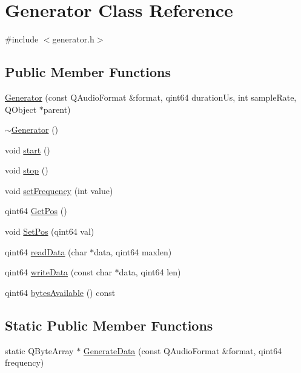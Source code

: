 \hypertarget{class_generator}{\section{Generator Class Reference}
\label{class_generator}
}


{\ttfamily \#include $<$generator.\-h$>$}

\subsection*{Public Member Functions}
\begin{DoxyCompactItemize}
\item 
\hyperlink{class_generator_ac70583c21208d97c0474d9ab23f69a2b}{Generator} (const Q\-Audio\-Format \&format, qint64 duration\-Us, int sample\-Rate, Q\-Object $\ast$parent)
\item 
\hyperlink{class_generator_acc85fbe22690003267ba899bacf777d1}{$\sim$\-Generator} ()
\item 
void \hyperlink{class_generator_a3f0bc6d7fed7eaf8d497d3e50149982b}{start} ()
\item 
void \hyperlink{class_generator_a698e9aa26989e005a709c297ebea3492}{stop} ()
\item 
void \hyperlink{class_generator_a54a730f69fe887837f3f83080e32201f}{set\-Frequency} (int value)
\item 
qint64 \hyperlink{class_generator_ada073b90efc5104c049eef04844c8801}{Get\-Pos} ()
\item 
void \hyperlink{class_generator_a9aa165c8eca0883e9792d63153701f49}{Set\-Pos} (qint64 val)
\item 
qint64 \hyperlink{class_generator_ac818d4583f77c0f29bbeafbb31995ff8}{read\-Data} (char $\ast$data, qint64 maxlen)
\item 
qint64 \hyperlink{class_generator_a16d82d88527ec5a0be4052b13d63417a}{write\-Data} (const char $\ast$data, qint64 len)
\item 
qint64 \hyperlink{class_generator_ab06a2f7a10bdcf3edd3fd0a11ac6d53f}{bytes\-Available} () const 
\end{DoxyCompactItemize}
\subsection*{Static Public Member Functions}
\begin{DoxyCompactItemize}
\item 
static Q\-Byte\-Array $\ast$ \hyperlink{class_generator_abaee73437c469e40bf5d7c0c15bdc48f}{Generate\-Data} (const Q\-Audio\-Format \&format, qint64 frequency)
\end{DoxyCompactItemize}
